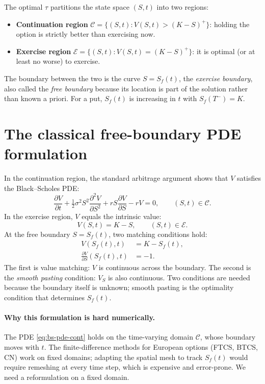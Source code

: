 \documentclass[11pt,a4paper]{article}
\begin{document}
The optimal $\tau$ partitions the state space $(S, t)$ into two
regions:
\begin{itemize}[leftmargin=2em]
\item \textbf{Continuation region} $\mathcal{C} = \{(S, t) : V(S, t) >
(K - S)^+\}$: holding the option is strictly better than exercising
now.
\item \textbf{Exercise region} $\mathcal{E} = \{(S, t) : V(S, t) =
(K - S)^+\}$: it is optimal (or at least no worse) to exercise.
\end{itemize}
The boundary between the two is the curve
$S = S_f(t)$, the \emph{exercise boundary}, also called the
\emph{free boundary} because its location is part of the solution
rather than known a priori. For a put, $S_f(t)$ is increasing in
$t$ with $S_f(T^-) = K$.

\section{The classical free-boundary PDE formulation}

In the continuation region, the standard arbitrage argument shows
that $V$ satisfies the Black--Scholes PDE:
\begin{equation}
\frac{\partial V}{\partial t} + \tfrac{1}{2}\sigma^2 S^2
\frac{\partial^2 V}{\partial S^2} + r S \frac{\partial V}{\partial S}
- r V = 0, \qquad (S, t) \in \mathcal{C}.
\label{eq:bs-pde-cont}
\end{equation}
In the exercise region, $V$ equals the intrinsic value:
\begin{equation}
V(S, t) = K - S, \qquad (S, t) \in \mathcal{E}.
\label{eq:exercise-region}
\end{equation}
At the free boundary $S = S_f(t)$, two matching conditions hold:
\begin{align}
V(S_f(t), t) &= K - S_f(t), \label{eq:value-matching} \\
\frac{\partial V}{\partial S}(S_f(t), t) &= -1.
\label{eq:smooth-pasting}
\end{align}
The first is value matching: $V$ is continuous across the boundary.
The second is the \emph{smooth pasting} condition: $V_S$ is also
continuous. Two conditions are needed because the boundary itself
is unknown; smooth pasting is the optimality condition that
determines $S_f(t)$.

\paragraph{Why this formulation is hard numerically.} The PDE
\eqref{eq:bs-pde-cont} holds on the time-varying domain
$\mathcal{C}$, whose boundary moves with $t$. The finite-difference
methods for European options (FTCS, BTCS, CN) work on fixed domains; adapting the spatial
mesh to track $S_f(t)$ would require remeshing at every time step,
which is expensive and error-prone. We need a reformulation on a
fixed domain.
\end{document}
